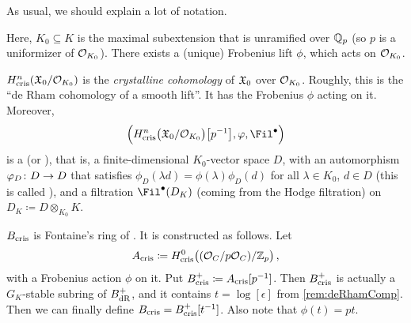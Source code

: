\documentclass[a4paper, 10pt, oneside, DIV=9, chapterprefix=true, numbers=enddot]{scrbook}
\begin{document}
\begin{rem}
	As usual, we should explain a lot of notation.
	\begin{numerate}
		\item Here, $K_0\subseteq K$ is the maximal subextension that is unramified over $\mathbb{Q}_p$ (so $p$ is a uniformizer of $\mathcal{O}_{K_0}$). There exists a (unique) Frobenius lift $\phi$, which acts on $\mathcal{O}_{K_0}$.
		\item $H_{\mathrm{cris}}^n(\mathfrak{X}_0/\mathcal{O}_{K_0})$ is the \emph{crystalline cohomology} of $\mathfrak{X}_0$ over $\mathcal{O}_{K_0}$. Roughly, this is the \enquote{de Rham cohomology of a smooth lift}. It has the Frobenius $\phi$ acting on it. Moreover,
		\begin{equation*}
			\Big(H_\cris^n\big(\XX_0/\Oo_{K_0}\big)\big[p^{-1}\big], \phi, \Fil^\bullet\Big)
		\end{equation*}
		is a  (or ), that is, a finite-dimensional $K_0$-vector space $D$, with an automorphism $\phi_D\colon D\morphism D$ that satisfies $\phi_D(\lambda d)=\phi(\lambda)\phi_D(d)$ for all $\lambda\in K_0$, $d\in D$ (this is called ), and a filtration $\Fil^\bullet(D_K)$ (coming from the Hodge filtration) on $D_K\coloneqq D\otimes_{K_0}K$.
		\item $B_{\mathrm{cris}}$ is Fontaine's ring of . It is constructed as follows. Let
		\begin{equation*}
			A_{\mathrm{cris}}\coloneqq H_{\mathrm{cris}}^0\big((\mathcal{O}_C/p\mathcal{O}_C)/\mathbb{Z}_p\big)\,,
		\end{equation*}
		with a Frobenius action $\phi$ on it. Put $B_{\mathrm{cris}}^+\coloneqq A_{\mathrm{cris}}[p^{-1}]$. Then $B_{\mathrm{cris}}^+$ is actually a $G_K$-stable subring of $B_{\mathrm{dR}}^+$, and it contains $t=\log{}[\epsilon]$ from \cref{rem:deRhamComp}. Then we can finally define $B_{\mathrm{cris}}=B_{\mathrm{cris}}^+[t^{-1}]$. Also note that $\phi(t)=pt$.
		

\end{numerate}
\end{rem}
\end{document}
